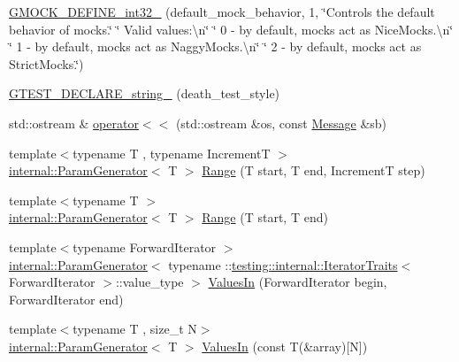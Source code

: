 \begin{DoxyCompactItemize}
\item 
\mbox{\hyperlink{namespacetesting_a211b4be008f5b4cccee486a262d91a52}{G\+M\+O\+C\+K\+\_\+\+D\+E\+F\+I\+N\+E\+\_\+int32\+\_\+}} (default\+\_\+mock\+\_\+behavior, 1, \char`\"{}Controls the default behavior of mocks.\char`\"{} \char`\"{}  Valid values\+:\textbackslash{}n\char`\"{} \char`\"{}  0 -\/ by default, mocks act as Nice\+Mocks.\textbackslash{}n\char`\"{} \char`\"{}  1 -\/ by default, mocks act as Naggy\+Mocks.\textbackslash{}n\char`\"{} \char`\"{}  2 -\/ by default, mocks act as Strict\+Mocks.\char`\"{})
\item 
\mbox{\hyperlink{namespacetesting_a37b7e87f0a5f502c6918f37d1768c1f3}{G\+T\+E\+S\+T\+\_\+\+D\+E\+C\+L\+A\+R\+E\+\_\+string\+\_\+}} (death\+\_\+test\+\_\+style)
\item 
std\+::ostream \& \mbox{\hyperlink{namespacetesting_a2d038049296f23fb404311f974788cd3}{operator$<$$<$}} (std\+::ostream \&os, const \mbox{\hyperlink{classtesting_1_1_message}{Message}} \&sb)
\item 
{\footnotesize template$<$typename T , typename IncrementT $>$ }\\\mbox{\hyperlink{classtesting_1_1internal_1_1_param_generator}{internal\+::\+Param\+Generator}}$<$ T $>$ \mbox{\hyperlink{namespacetesting_a4f2c9978ad0c764f57e0cbd6f72cb540}{Range}} (T start, T end, IncrementT step)
\item 
{\footnotesize template$<$typename T $>$ }\\\mbox{\hyperlink{classtesting_1_1internal_1_1_param_generator}{internal\+::\+Param\+Generator}}$<$ T $>$ \mbox{\hyperlink{namespacetesting_a9422b51662c54e62609fadcee050595c}{Range}} (T start, T end)
\item 
{\footnotesize template$<$typename Forward\+Iterator $>$ }\\\mbox{\hyperlink{classtesting_1_1internal_1_1_param_generator}{internal\+::\+Param\+Generator}}$<$ typename \+::\mbox{\hyperlink{structtesting_1_1internal_1_1_iterator_traits}{testing\+::internal\+::\+Iterator\+Traits}}$<$ Forward\+Iterator $>$\+::value\+\_\+type $>$ \mbox{\hyperlink{namespacetesting_a96240380ae4d3b4855d07de3b84fb336}{Values\+In}} (Forward\+Iterator begin, Forward\+Iterator end)
\item 
{\footnotesize template$<$typename T , size\+\_\+t N$>$ }\\\mbox{\hyperlink{classtesting_1_1internal_1_1_param_generator}{internal\+::\+Param\+Generator}}$<$ T $>$ \mbox{\hyperlink{namespacetesting_affa90ba3821bd7ac15f147b1c31f9a73}{Values\+In}} (const T(\&array)\mbox{[}N\mbox{]})

\end{DoxyCompactItemize}
